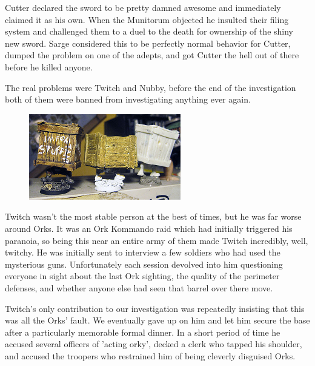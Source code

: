 Cutter declared the sword to be pretty damned awesome and immediately claimed it as his own. 
When the Munitorum objected he insulted their filing system and challenged them to a duel to the death for ownership of the shiny new sword. 
Sarge considered this to be perfectly normal behavior for Cutter, dumped the problem on one of the adepts, and got Cutter the hell out of there before he killed anyone.

The real problems were Twitch and Nubby, before the end of the investigation both of them were banned from investigating anything ever again.

\begin{figure}
	\begin{center}
		\includegraphics[width=\figwidth]{pics/4/11.png}
	\end{center}
\end{figure}
Twitch wasn't the most stable person at the best of times, but he was far worse around Orks. 
It was an Ork Kommando raid which had initially triggered his paranoia, so being this near an entire army of them made Twitch incredibly, well, twitchy. 
He was initially sent to interview a few soldiers who had used the mysterious guns. 
Unfortunately each session devolved into him questioning everyone in sight about the last Ork sighting, the quality of the perimeter defenses, and whether anyone else had seen that barrel over there move. 

Twitch's only contribution to our investigation was repeatedly insisting that this was all the Orks' fault.
We eventually gave up on him and let him secure the base after a particularly memorable formal dinner. 
In a short period of time he accused several officers of 'acting orky', decked a clerk who tapped his shoulder, and accused the troopers who restrained him of being cleverly disguised Orks.

